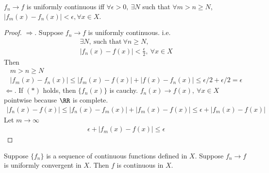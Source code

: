 \documentclass[class=scrartcl, crop=false]{standalone}
\begin{document}
\begin{lemma}
  $f_n \to f$ is uniformly continuous iff $\forall \epsilon > 0, \ \exists N$ such that $\forall m > n \geq N$, $|f_m(x) - f_n(x)| < \epsilon, \forall x \in X$.
  \begin{proof}
    $\Rightarrow$. Suppose $f_n \to f$ is uniformly continuous. i.e.
    \begin{gather*}
      \exists N, \ \text{such that} \ \forall n \geq N, \\
      |f_n(x) - f(x)| < \frac{\epsilon}{2}, \ \forall x \in X
    \end{gather*} 
    Then
    \begin{gather*}
      m > n \geq N \\
      |f_m(x) - f_n(x)| \leq |f_m(x) - f(x)| + |f(x) - f_n(x)| \leq \epsilon / 2 + \epsilon / 2 = \epsilon
    \end{gather*} 
    $\Leftarrow$. If $(*)$ holds, then $\{f_n(x)\}$ is cauchy. $f_n(x) \to f(x), \ \forall x \in X$ pointwise because $\RR$ is complete.
    \begin{gather*}
      |f_n(x) - f(x)| \leq |f_n(x) - f_m(x)| + |f_m(x) - f(x)| \leq \epsilon + |f_m(x) - f(x)|
    \end{gather*} 
    Let $m \to \infty$
     \begin{gather*}
       \epsilon + |f_m(x) - f(x)| \leq \epsilon
    \end{gather*} 
  \end{proof} 
\end{lemma} 

\begin{theorem}
  Suppose $\{f_n\}$ is a sequence of continuous functions defined in $X$. Suppose $f_n \to f$ is uniformly convergent in $X$. Then $f$ is continuous in $X$.
\end{theorem} 
\end{document}

